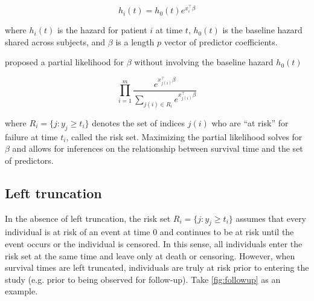 \documentclass[11pt,final,fleqn]{article}\usepackage[]{graphicx}\usepackage[]{color}
\theoremstyle{plain}
\begin{document}
\begin{equation}
h_i(t) = h_0(t)e^{x_i^\intercal\beta}
\end{equation}

where $h_i(t)$ is the hazard for patient $i$ at time $t$, $h_0(t)$ is the baseline hazard shared across subjects, and $\beta$ is a length $p$ vector of predictor coefficients.  

\citet{cox1972regression} proposed a partial likelihood for $\beta$ without involving the baseline hazard $h_0(t)$

\begin{equation} \label{eqn:cox1972}
\prod_{i=1}^{m} \frac{e^{x_{j(i)}^\intercal\beta}}{\sum_{j(i)\in R_i}  e^{x_{j(i)}^\intercal\beta}   } 
\end{equation}

where  $R_i = \{ j : y_j \geq t_i\}$ denotes the set of indices $j(i)$ who are ``at risk'' for failure at time $t_i$, called the risk set. Maximizing the partial likelihood solves for $\beta$ and allows for inferences on the relationship between survival time and the set of predictors. 

\subsection{Left truncation}
In the absence of left truncation, the risk set $R_i = \{ j : y_j \geq t_i \}$ assumes that every individual is at risk of an event at time 0 and continues to be at risk until the event occurs or the individual is censored. In this sense, all individuals enter the risk set at the same time and leave only at death or censoring. However, when survival times are left truncated, individuals are truly at risk prior to entering the study (e.g. prior to being observed for follow-up). Take \autoref{fig:followup} as an example.
\end{document}
